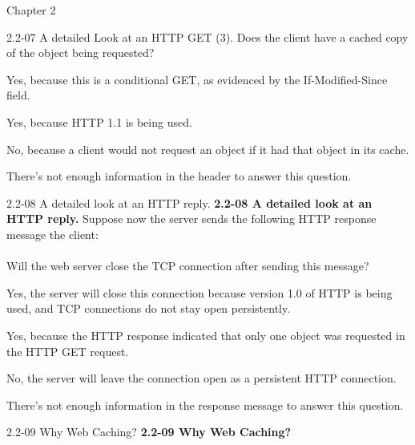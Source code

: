 \documentclass[a4paper]{article}
\begin{document}
\begin{quiz}{Chapter 2}
\begin{multi}[points=1,shuffle]{2.2-07 A detailed Look at an HTTP GET (3).}
Does the client have a cached copy of the object being requested? 

\item* Yes, because this is a conditional GET, as evidenced by the If-Modified-Since field.
\item Yes, because HTTP 1.1 is being used.
\item No, because a client would not request an object if it had that object in its cache.
\item There's not enough information in the header to answer this question.
\end{multi}

\begin{multi}[points=1,shuffle]{2.2-08 A detailed look at an HTTP reply.}
\textbf{2.2-08 A detailed look at an HTTP reply.} 
Suppose now the server sends the following HTTP response message the client: \\

\\

Will the web server close the TCP connection after sending this message? 
\item* Yes, the server will close this connection because version 1.0 of HTTP is being used, and TCP connections do not stay open persistently.
\item Yes, because the HTTP response indicated that only one object was requested in the HTTP GET request.
\item No, the server will leave the connection open as a persistent HTTP connection.
\item There's not enough information in the response message to answer this question.
\end{multi}

\begin{multi}[points=1,shuffle,multiple]{2.2-09 Why Web Caching?}
\textbf{2.2-09 Why Web Caching?} 


\end{multi}
\end{quiz}
\end{document}

